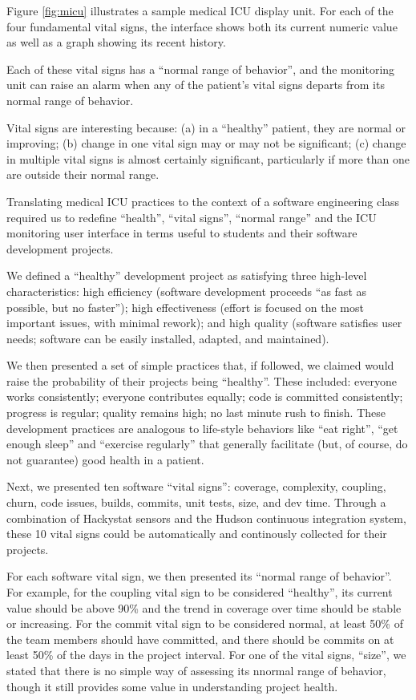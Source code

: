\documentclass{acm_proc_article-sp}
\begin{document}
Figure \ref{fig:micu} illustrates a sample medical ICU display unit. For
each of the four fundamental vital signs, the interface shows both its
current numeric value as well as a graph showing its recent history.  

Each of these vital signs has a ``normal range of behavior'', and the
monitoring unit can raise an alarm when any of the patient's vital signs departs
from its normal range of behavior.

Vital signs are interesting because: (a) in a ``healthy'' patient, they are
normal or improving; (b) change in one vital sign may or may not be
significant; (c) change in multiple vital signs is almost certainly
significant, particularly if more than one are outside their normal range.

Translating medical ICU practices to the context of a software engineering
class required us to redefine ``health'', ``vital signs'', ``normal range''
and the ICU monitoring user interface in terms useful to students and their
software development projects.

We defined a ``healthy'' development project as satisfying three high-level
characteristics: high efficiency (software development proceeds ``as fast
as possible, but no faster''); high effectiveness (effort is focused on the
most important issues, with minimal rework); and high quality (software
satisfies user needs; software can be easily installed, adapted, and
maintained).

We then presented a set of simple practices that, if followed, we claimed
would raise the probability of their projects being ``healthy''.  These
included: everyone works consistently; everyone contributes equally; code
is committed consistently; progress is regular; quality remains high; no
last minute rush to finish.  These development practices are analogous to
life-style behaviors like ``eat right'', ``get enough sleep'' and
``exercise regularly'' that generally facilitate (but, of course, do not
guarantee) good health in a patient.

Next, we presented ten software ``vital signs'': coverage, complexity,
coupling, churn, code issues, builds, commits, unit tests, size, and dev
time. Through a combination of Hackystat sensors and the Hudson continuous
integration system, these 10 vital signs could be automatically and
continously collected for their projects.

For each software vital sign, we then presented its ``normal range of
behavior''.  For example, for the coupling vital sign to be considered
``healthy'', its current value should be above 90\% and the trend in
coverage over time should be stable or increasing.  For the commit vital
sign to be considered normal, at least 50\% of the team members should have
committed, and there should be commits on at least 50\% of the days in the
project interval.  For one of the vital signs, ``size'', we stated that
there is no simple way of assessing its nnormal range of behavior, though
it still provides some value in understanding project health.
\end{document}
